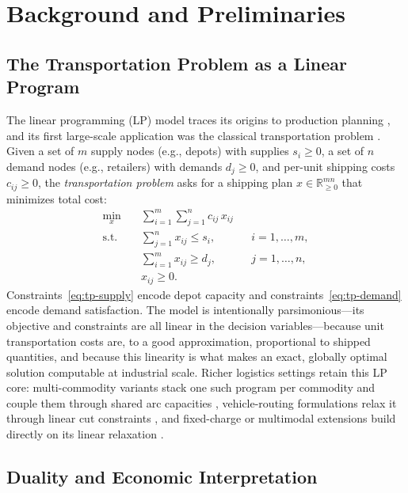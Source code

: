 \section{Background and Preliminaries}
\label{sec:background}

\subsection{The Transportation Problem as a Linear Program}

The linear programming (LP) model traces its origins to production planning \citep{kantorovich1960mathematical}, and its first large-scale application was the classical transportation problem \citep{hitchcock1941distribution,dantzig1951application}. Given a set of $m$ supply nodes (e.g., depots) with supplies $s_i \geq 0$, a set of $n$ demand nodes (e.g., retailers) with demands $d_j \geq 0$, and per-unit shipping costs $c_{ij} \geq 0$, the \emph{transportation problem} asks for a shipping plan $x \in \mathbb{R}^{mn}_{\geq 0}$ that minimizes total cost:
\begin{align}
  \min_{x} \quad & \sum_{i=1}^{m}\sum_{j=1}^{n} c_{ij}\, x_{ij} \label{eq:tp-obj}\\
  \text{s.t.} \quad
  & \sum_{j=1}^{n} x_{ij} \leq s_i, && i = 1, \dots, m, \label{eq:tp-supply}\\
  & \sum_{i=1}^{m} x_{ij} \geq d_j, && j = 1, \dots, n, \label{eq:tp-demand}\\
  & x_{ij} \geq 0. && \label{eq:tp-nonneg}
\end{align}
Constraints~\eqref{eq:tp-supply} encode depot capacity and constraints~\eqref{eq:tp-demand} encode demand satisfaction. The model is intentionally parsimonious---its objective and constraints are all linear in the decision variables---because unit transportation costs are, to a good approximation, proportional to shipped quantities, and because this linearity is what makes an exact, globally optimal solution computable at industrial scale. Richer logistics settings retain this LP core: multi-commodity variants stack one such program per commodity and couple them through shared arc capacities \citep{dai2019mcf,brand2023mcf}, vehicle-routing formulations relax it through linear cut constraints \citep{munari2016vrp}, and fixed-charge or multimodal extensions build directly on its linear relaxation \citep{saraswathi2026support,su2025freight}.

\subsection{Duality and Economic Interpretation}
\label{sec:duality}

